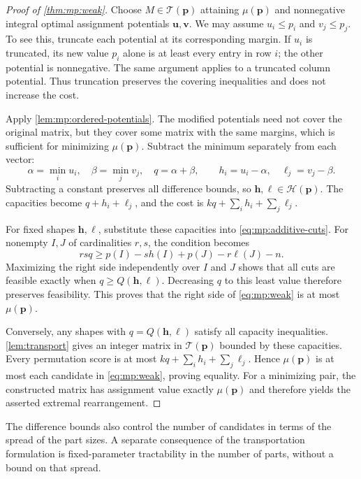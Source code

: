 \documentclass[10pt,a4paper]{amsart}
\numberwithin{equation}{section}
\theoremstyle{definition}
\theoremstyle{remark}
\begin{document}
\begin{proof}[Proof of \cref{thm:mp:weak}]
Choose $M\in\mathcal T(\mathbf p)$ attaining $\mu(\mathbf p)$ and
nonnegative integral optimal assignment potentials $\mathbf u,\mathbf v$.
We may assume $u_i\le p_i$ and $v_j\le p_j$. To see this, truncate each
potential at its corresponding margin. If $u_i$ is truncated, its new
value $p_i$ alone is at least every entry in row $i$; the other potential
is nonnegative. The same argument applies to a truncated column
potential. Thus truncation preserves the covering inequalities and
does not increase the cost.

Apply \cref{lem:mp:ordered-potentials}. The modified potentials
need not cover the original matrix, but they cover some matrix with
the same margins, which is sufficient for minimizing
$\mu(\mathbf p)$. Subtract the minimum separately from each vector:
\[
 \alpha=\min_i u_i,\quad \beta=\min_jv_j,\quad q=\alpha+\beta,
 \qquad h_i=u_i-\alpha,\quad \ell_j=v_j-\beta.
\]
Subtracting a constant preserves all difference bounds, so
$\mathbf h,\boldsymbol\ell\in\mathcal H(\mathbf p)$. The
capacities become $q+h_i+\ell_j$, and the cost is
$kq+\sum_i h_i+\sum_j\ell_j$.

For fixed shapes $\mathbf h,\boldsymbol\ell$, substitute these
capacities into \eqref{eq:mp:additive-cuts}. For nonempty $I,J$ of
cardinalities $r,s$, the condition becomes
\[
 rsq\ge p(I)-s h(I)+p(J)-r\ell(J)-n.
\]
Maximizing the right side independently over $I$ and $J$ shows that
all cuts are feasible exactly when $q\ge Q(\mathbf h,\boldsymbol\ell)$.
Decreasing $q$ to this least value therefore preserves feasibility.
This proves that the right side of \eqref{eq:mp:weak} is at most
$\mu(\mathbf p)$.

Conversely, any shapes with $q=Q(\mathbf h,\boldsymbol\ell)$ satisfy
all capacity inequalities. \cref{lem:transport} gives an integer
matrix in $\mathcal T(\mathbf p)$ bounded by these capacities.
Every permutation score is at most
$kq+\sum_i h_i+\sum_j\ell_j$. Hence $\mu(\mathbf p)$ is at most
each candidate in \eqref{eq:mp:weak}, proving equality. For a minimizing
pair, the constructed matrix has assignment value exactly
$\mu(\mathbf p)$ and therefore yields the asserted extremal
rearrangement.
\end{proof}

The difference bounds also control the number of candidates in terms
of the spread of the part sizes. A separate consequence of the
transportation formulation is fixed-parameter tractability in the
number of parts, without a bound on that spread.
\end{document}
